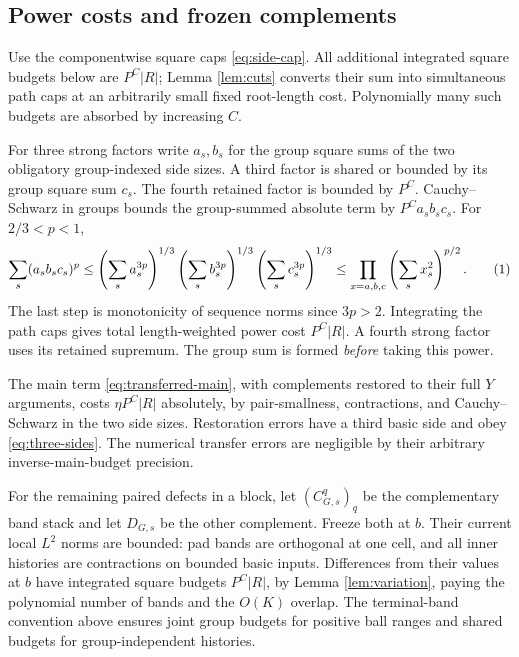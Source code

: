 \documentclass[11pt]{article}
\theoremstyle{definition}
\newcommand{\eqtag}[1]{\refstepcounter{equation}\tag{\theequation}\label{#1}}
\numberwithin{equation}{section}
\begin{document}
\subsection*{Power costs and frozen complements}
Use the componentwise square caps \eqref{eq:side-cap}. All additional integrated square budgets below are $P^C|R|$; Lemma \ref{lem:cuts} converts their sum into simultaneous path caps at an arbitrarily small fixed root-length cost. Polynomially many such budgets are absorbed by increasing $C$.

For three strong factors write $a_s,b_s$ for the group square sums of the two obligatory group-indexed side sizes. A third factor is shared or bounded by its group square sum $c_s$. The fourth retained factor is bounded by $P^C$. Cauchy--Schwarz in groups bounds the group-summed absolute term by $P^Ca_sb_sc_s$. For $2/3<p<1$,
\[
 \sum_s(a_sb_sc_s)^p
 \le\left(\sum_sa_s^{3p}\right)^{1/3}\left(\sum_sb_s^{3p}\right)^{1/3}\left(\sum_sc_s^{3p}\right)^{1/3}
 \le\prod_{x=a,b,c}\left(\sum_sx_s^2\right)^{p/2}.
 \eqtag{eq:three-sides}
\]
The last step is monotonicity of sequence norms since $3p>2$. Integrating the path caps gives total length-weighted power cost $P^C|R|$. A fourth strong factor uses its retained supremum. The group sum is formed \emph{before} taking this power.

The main term \eqref{eq:transferred-main}, with complements restored to their full $Y$ arguments, costs $\eta P^C|R|$ absolutely, by pair-smallness, contractions, and Cauchy--Schwarz in the two side sizes. Restoration errors have a third basic side and obey \eqref{eq:three-sides}. The numerical transfer errors are negligible by their arbitrary inverse-main-budget precision.

For the remaining paired defects in a block, let $(C_{G,s}^q)_q$ be the complementary band stack and let $D_{G,s}$ be the other complement. Freeze both at $b$. Their current local $L^2$ norms are bounded: pad bands are orthogonal at one cell, and all inner histories are contractions on bounded basic inputs. Differences from their values at $b$ have integrated square budgets $P^C|R|$, by Lemma \ref{lem:variation}, paying the polynomial number of bands and the $O(K)$ overlap. The terminal-band convention above ensures joint group budgets for positive ball ranges and shared budgets for group-independent histories.
\end{document}
